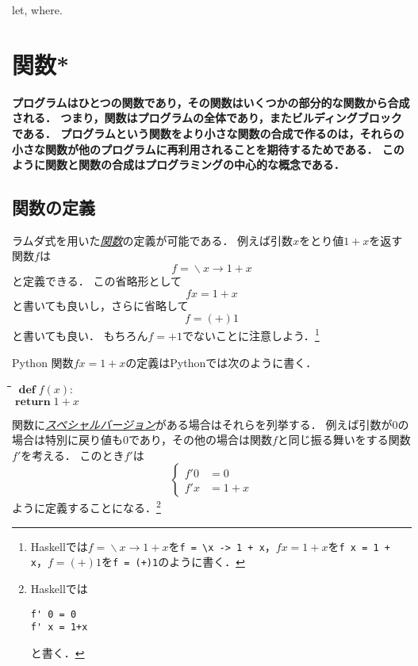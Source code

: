 \documentclass[twocolumn]{jsbook}
\newcommand{\keyword}[1]{\underline{\emph{#1}}}
\newcommand{\code}[1]{\texttt{#1}}
\newenvironment{leader}{\begingroup\bf}{\endgroup}
\newenvironment{pythoncode}{\begin{itembox}[r]{Python}}{\end{itembox}}
\newenvironment{python}{\begin{tabbing}\hspace*{2em}\=\hspace*{2em}\=\hspace*{2em}\=\hspace*{2em}\=\kill}{\end{tabbing}}
\newcommand{\pthnKeyword}[1]{\textbf{#1}}
\DeclareMathOperator{\pthnDef}{\pthnKeyword{def}}
\DeclareMathOperator{\pthnReturn}{\pthnKeyword{return}}
\DeclareMathOperator{\mathLambda}{\backslash}
\newcommand{\mathLambdaArrow}{\rightarrow}
\newcommand{\mathLambdaExpression}[2]{\mathLambda#1\mathLambdaArrow#2}
\begin{document}
let, where.

\chapter{関数*}

\begin{leader}
プログラムはひとつの関数であり，その関数はいくつかの部分的な関数から合成される．
つまり，関数はプログラムの全体であり，またビルディングブロックである．
プログラムという関数をより小さな関数の合成で作るのは，それらの小さな関数が他のプログラムに再利用されることを期待するためである．
このように関数と関数の合成はプログラミングの中心的な概念である．
\end{leader}

\section{関数の定義}

ラムダ式を用いた\keyword{関数}の定義が可能である．
例えば引数$x$をとり値$1+x$を返す関数$f$は$$f=\mathLambdaExpression{x}{1+x}$$と定義できる．
この省略形として$$fx=1+x$$と書いても良いし，さらに省略して$$f=(+)1$$と書いても良い．
もちろん$f=+1$でないことに注意しよう．\footnote{Haskellでは$f=\mathLambdaExpression{x}{1+x}$を\code{f = \textbackslash x -> 1 + x}，$fx=1+x$を\code{f x = 1 + x}，$f=(+)1$を\code{f = (+)1}のように書く．}

\begin{pythoncode}
関数$fx=1+x$の定義はPythonでは次のように書く．
\begin{python}
$\pthnDef f(x):$\\
\>$\pthnReturn1+x$
\end{python}
\end{pythoncode}

関数に\keyword{スペシャルバージョン}がある場合はそれらを列挙する．
例えば引数が$0$の場合は特別に戻り値も$0$であり，その他の場合は関数$f$と同じ振る舞いをする関数$f'$を考える．
このとき$f'$は
\begin{equation*}
\left\{
\begin{split}
f'0&=0\\
f'x&=1+x
\end{split}
\right.
\end{equation*}
ように定義することになる．\footnote{Haskellでは
\begin{Verbatim}[xleftmargin=10mm]
f' 0 = 0
f' x = 1+x
\end{Verbatim}
と書く．}
\end{document}

